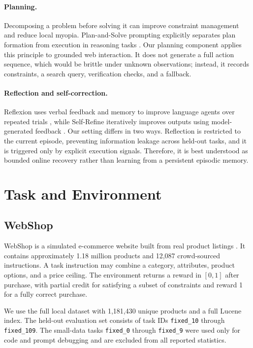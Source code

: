 \documentclass{article}
\begin{document}
\paragraph{Planning.}
Decomposing a problem before solving it can improve constraint management and reduce local myopia. Plan-and-Solve prompting explicitly separates plan formation from execution in reasoning tasks \citep{wang2023plan}. Our planning component applies this principle to grounded web interaction. It does not generate a full action sequence, which would be brittle under unknown observations; instead, it records constraints, a search query, verification checks, and a fallback.

\paragraph{Reflection and self-correction.}
Reflexion uses verbal feedback and memory to improve language agents over repeated trials \citep{shinn2023reflexion}, while Self-Refine iteratively improves outputs using model-generated feedback \citep{madaan2023selfrefine}. Our setting differs in two ways. Reflection is restricted to the current episode, preventing information leakage across held-out tasks, and it is triggered only by explicit execution signals. Therefore, it is best understood as bounded online recovery rather than learning from a persistent episodic memory.

\section{Task and Environment}

\subsection{WebShop}

WebShop is a simulated e-commerce website built from real product listings \citep{yao2022webshop}. It contains approximately 1.18 million products and 12,087 crowd-sourced instructions. A task instruction may combine a category, attributes, product options, and a price ceiling. The environment returns a reward in $[0,1]$ after purchase, with partial credit for satisfying a subset of constraints and reward 1 for a fully correct purchase.

We use the full local dataset with 1,181,430 unique products and a full Lucene index. The held-out evaluation set consists of task IDs \texttt{fixed\_10} through \texttt{fixed\_109}. The small-data tasks \texttt{fixed\_0} through \texttt{fixed\_9} were used only for code and prompt debugging and are excluded from all reported statistics.
\end{document}
